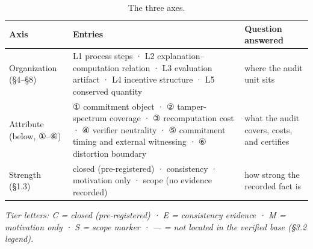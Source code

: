 \documentclass[11pt,a4paper]{article}
\begin{document}
\begin{table}[htbp]
\centering
\footnotesize
\setlength{\tabcolsep}{3.5pt}
\renewcommand{\arraystretch}{1.18}
\begin{tabularx}{0.985\textwidth}{>{\raggedright\arraybackslash}p{} >{\raggedright\arraybackslash}X >{\raggedright\arraybackslash}p{}}
\toprule
\textbf{Axis} & \textbf{Entries} & \textbf{Question answered} \\
\midrule
Organization (§4–§8) & L1 process steps · L2 explanation–computation relation · L3 evaluation artifact · L4 incentive structure · L5 conserved quantity & where the audit unit sits \\
Attribute (below, ①–⑥) & ① commitment object · ② tamper-spectrum coverage · ③ recomputation cost · ④ verifier neutrality · ⑤ commitment timing and external witnessing · ⑥ distortion boundary & what the audit covers, costs, and certifies \\
Strength (§1.3) & closed (pre-registered) · consistency · motivation only · scope (no evidence recorded) & how strong the recorded fact is \\
\bottomrule
\end{tabularx}
\caption{The three axes.}
\label{tab:T1}
\end{table}

\textit{Tier letters: C = closed (pre-registered) · E = consistency evidence · M = motivation only · S = scope marker · — = not located in the verified base (§3.2 legend).}
\end{document}
